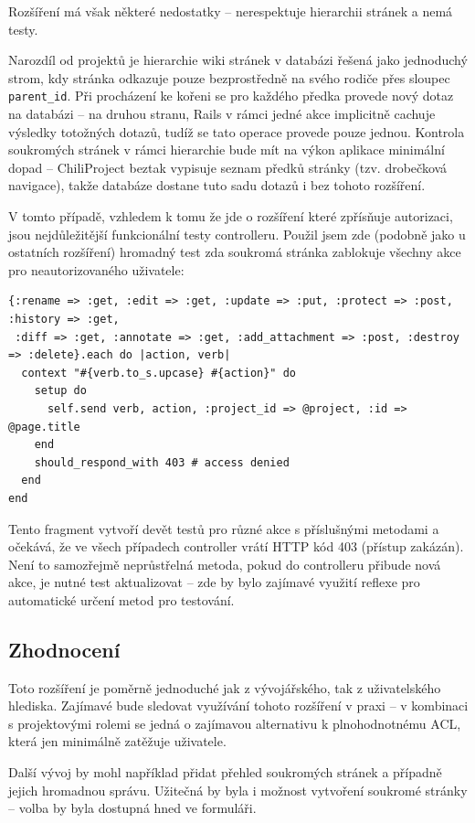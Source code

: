 \documentclass[thesis=B,czech]{FITthesis}[2012/05/02]
\begin{document}
Rozšíření má však některé nedostatky -- nerespektuje hierarchii stránek
a nemá testy.

Narozdíl od projektů je hierarchie wiki stránek v databázi řešená jako
jednoduchý strom, kdy stránka odkazuje pouze bezprostředně na svého
rodiče přes sloupec \lstinline!parent_id!. Při procházení ke kořeni se
pro každého předka provede nový dotaz na databázi -- na druhou stranu,
Rails v rámci jedné akce implicitně cachuje výsledky totožných dotazů,
tudíž se tato operace provede pouze jednou. Kontrola soukromých stránek
v rámci hierarchie bude mít na výkon aplikace minimální dopad --
ChiliProject beztak vypisuje seznam předků stránky (tzv. drobečková
navigace), takže databáze dostane tuto sadu dotazů i bez tohoto
rozšíření.

V tomto případě, vzhledem k tomu že jde o rozšíření které zpřísňuje
autorizaci, jsou nejdůležitější funkcionální testy controlleru. Použil
jsem zde (podobně jako u ostatních rozšíření) hromadný test zda soukromá
stránka zablokuje všechny akce pro neautorizovaného uživatele:

\begin{lstlisting}
{:rename => :get, :edit => :get, :update => :put, :protect => :post, :history => :get,
 :diff => :get, :annotate => :get, :add_attachment => :post, :destroy => :delete}.each do |action, verb|
  context "#{verb.to_s.upcase} #{action}" do
    setup do
      self.send verb, action, :project_id => @project, :id => @page.title
    end
    should_respond_with 403 # access denied
  end
end
\end{lstlisting}
Tento fragment vytvoří devět testů pro různé akce s příslušnými metodami
a očekává, že ve všech případech controller vrátí HTTP kód 403
(přístup zakázán). Není to samozřejmě neprůstřelná metoda, pokud do
controlleru přibude nová akce, je nutné test aktualizovat -- zde by bylo
zajímavé využití reflexe pro automatické určení metod pro testování.

\subsection{Zhodnocení}

Toto rozšíření je poměrně jednoduché jak z vývojářského, tak
z uživatelského hlediska. Zajímavé bude sledovat využívání tohoto
rozšíření v praxi -- v kombinaci s projektovými rolemi se jedná
o zajímavou alternativu k plnohodnotnému \gls{ACL}, která jen minimálně
zatěžuje uživatele.

Další vývoj by mohl například přidat přehled soukromých stránek a
případně jejich hromadnou správu. Užitečná by byla i možnost vytvoření
soukromé stránky -- volba by byla dostupná hned ve formuláři.
\end{document}
